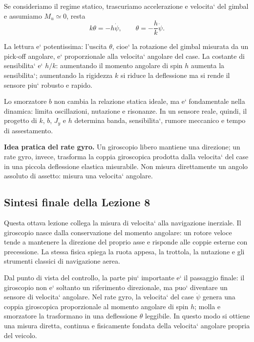 \documentclass[11pt,a4paper]{article}
\begin{document}
Se consideriamo il regime statico, trascuriamo accelerazione e velocita` del gimbal e assumiamo \(M_u\simeq 0\), resta
\[
k\theta=-h\dot\psi,
\qquad
\theta=-\frac{h}{k}\dot\psi.
\]

La lettura e` potentissima: l'uscita \(\theta\), cioe` la rotazione del gimbal misurata da un pick-off angolare, e` proporzionale alla velocita` angolare del case. La costante di sensibilita` e` \(h/k\): aumentando il momento angolare di spin \(h\) aumenta la sensibilita`; aumentando la rigidezza \(k\) si riduce la deflessione ma si rende il sensore piu` robusto e rapido.

Lo smorzatore \(b\) non cambia la relazione statica ideale, ma e` fondamentale nella dinamica: limita oscillazioni, nutazione e risonanze. In un sensore reale, quindi, il progetto di \(k\), \(b\), \(J_y\) e \(h\) determina banda, sensibilita`, rumore meccanico e tempo di assestamento.

\begin{keybox}
\textbf{Idea pratica del rate gyro.} Un giroscopio libero mantiene una direzione; un rate gyro, invece, trasforma la coppia giroscopica prodotta dalla velocita` del case in una piccola deflessione elastica misurabile. Non misura direttamente un angolo assoluto di assetto: misura una velocita` angolare.
\end{keybox}

\subsection*{Sintesi finale della Lezione 8}

Questa ottava lezione collega la misura di velocita` alla navigazione inerziale. Il giroscopio nasce dalla conservazione del momento angolare: un rotore veloce tende a mantenere la direzione del proprio asse e risponde alle coppie esterne con precessione. La stessa fisica spiega la ruota appesa, la trottola, la nutazione e gli strumenti classici di navigazione aerea.

Dal punto di vista del controllo, la parte piu` importante e` il passaggio finale: il giroscopio non e` soltanto un riferimento direzionale, ma puo` diventare un sensore di velocita` angolare. Nel rate gyro, la velocita` del case \(\dot\psi\) genera una coppia giroscopica proporzionale al momento angolare di spin \(h\); molla e smorzatore la trasformano in una deflessione \(\theta\) leggibile. In questo modo si ottiene una misura diretta, continua e fisicamente fondata della velocita` angolare propria del veicolo.
\end{document}

